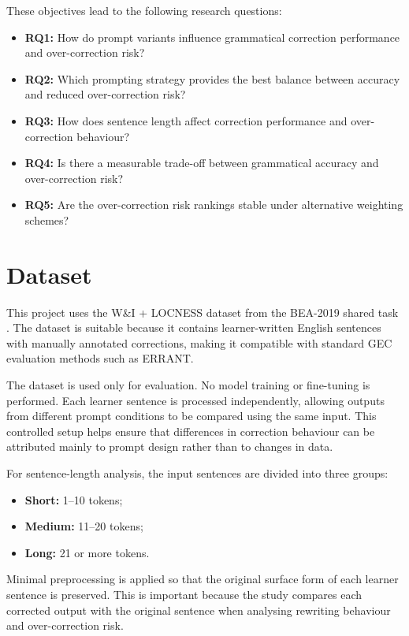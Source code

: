 These objectives lead to the following research questions:

\begin{itemize}
    \item \textbf{RQ1:} How do prompt variants influence grammatical correction performance and over-correction risk?
    \item \textbf{RQ2:} Which prompting strategy provides the best balance between accuracy and reduced over-correction risk?
    \item \textbf{RQ3:} How does sentence length affect correction performance and over-correction behaviour?
    \item \textbf{RQ4:} Is there a measurable trade-off between grammatical accuracy and over-correction risk?
    \item \textbf{RQ5:} Are the over-correction risk rankings stable under alternative weighting schemes?
\end{itemize}

\section{Dataset}

This project uses the W\&I + LOCNESS dataset from the BEA-2019 shared task \cite{bryant-etal-2019-bea}. The dataset is suitable because it contains learner-written English sentences with manually annotated corrections, making it compatible with standard GEC evaluation methods such as ERRANT.

The dataset is used only for evaluation. No model training or fine-tuning is performed. Each learner sentence is processed independently, allowing outputs from different prompt conditions to be compared using the same input. This controlled setup helps ensure that differences in correction behaviour can be attributed mainly to prompt design rather than to changes in data.

For sentence-length analysis, the input sentences are divided into three groups:

\begin{itemize}
    \item \textbf{Short:} 1--10 tokens;
    \item \textbf{Medium:} 11--20 tokens;
    \item \textbf{Long:} 21 or more tokens.
\end{itemize}

Minimal preprocessing is applied so that the original surface form of each learner sentence is preserved. This is important because the study compares each corrected output with the original sentence when analysing rewriting behaviour and over-correction risk.

